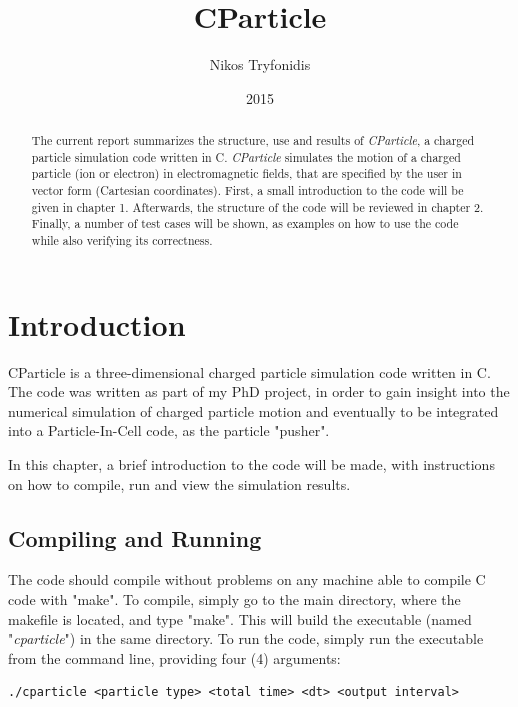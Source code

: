 \documentclass[11pt]{report}
\begin{document}
\title{\textbf{CParticle}}
\author{Nikos Tryfonidis}
\date{2015}

\maketitle

\begin{abstract}
The current report summarizes the structure, use and results of \emph{CParticle}, a charged particle simulation code written in C. \emph{CParticle} simulates the motion of a charged particle (ion or electron) in electromagnetic fields, that are specified by the user in vector form (Cartesian coordinates). First, a small introduction to the code will be given in chapter 1. Afterwards, the structure of the code will be reviewed in chapter 2. Finally, a number of test cases will be shown, as examples on how to use the code while also verifying its correctness.
\end{abstract}

\tableofcontents

\chapter{Introduction}
CParticle is a three-dimensional charged particle simulation code written in C. The code was written as part of my PhD project, in order to gain insight into the numerical simulation of charged particle motion and eventually to be integrated into a Particle-In-Cell code, as the particle "pusher".
\newline

In this chapter, a brief introduction to the code will be made, with instructions on how to compile, run and view the simulation results.

\section{Compiling and Running}
The code should compile without problems on any machine able to compile C code with "make". To compile, simply go to the main directory, where the makefile is located, and type "make". This will build the executable (named "\emph{cparticle}") in the same directory. To run the code, simply run the executable from the command line, providing four (4) arguments:

\begin{lstlisting}
./cparticle <particle type> <total time> <dt> <output interval>
\end{lstlisting}
\end{document}
